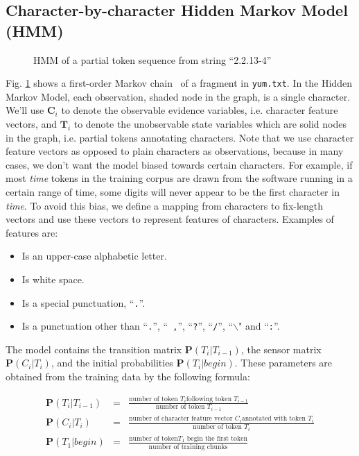 \subsection{Character-by-character Hidden Markov Model (HMM)}\label{subsec:hmm}

\begin{figure}[th]
\begin{center}
\end{center}
\caption{HMM of a partial token sequence from string ``2.2.13-4''}\label{fig:hmm}
\end{figure}

Fig. \ref{fig:hmm} shows a first-order Markov
chain~\cite{rabiner89:hmm} of a fragment in {\tt yum.txt}. In the Hidden Markov Model, each observation,
shaded node in the graph,
is a single character. We'll use $\mathbf{C}_i$ to denote the
observable evidence variables, i.e. character feature vectors, and
$\mathbf{T}_i$ to denote the unobservable state variables which are
solid nodes in the graph, i.e.
partial tokens annotating characters. Note that we use character
feature vectors as opposed to plain characters as observations,
because in many cases, we don't want the model biased towards
certain characters. For example, if most {\em time} tokens in the
training corpus are drawn from the software running in a certain
range of time, some digits will never appear to be the first
character in {\em time}. To avoid this bias, we define a mapping
from characters to fix-length vectors and use these vectors to
represent features of characters. Examples of features are:

\begin{itemize}
\item Is an upper-case alphabetic letter.
\item Is white space.
\item Is a special punctuation, ``{\tt .}''.
\item Is a punctuation other than ``{\tt .}'', ``{\tt
,}'', ``{\tt ?}'', ``{\tt /}'', ``{\tt $\backslash$}" and ``{\tt :}''.
\end{itemize}

The model contains the transition matrix $\mathbf{P}(T_i|T_{i-1})$,
the sensor matrix $\mathbf{P}(C_i|T_i)$, and the initial
probabilities $\mathbf{P}(T_i|begin)$. These parameters are obtained
from the training data by the following formula:

\begin{eqnarray}
\mathbf{P}(T_i|T_{i-1}) & = & \frac{\textrm{number of token }T_i\textrm{
following token }T_{i-1}}{\textrm{number of token }T_{i-1}} \label{eqn:1}\\
\mathbf{P}(C_i|T_i) & = & \frac{\textrm{number of character feature
vector }C_i\textrm{
annotated with token }T_i}{\textrm{number of token }T_i} \\
\mathbf{P}(T_1|begin) & = & \frac{\textrm{number of token
}T_1\textrm{ begin the first token}}{\textrm{number of training
chunks}} \label{eqn:2}
\end{eqnarray}

